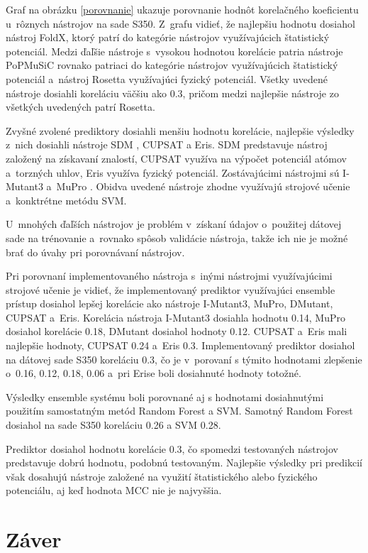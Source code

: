 Graf na obrázku \ref{porovnanie} ukazuje porovnanie hodnôt korelačného koeficientu u~rôznych nástrojov na sade S350. Z~grafu vidieť, že najlepšiu hodnotu dosiahol nástroj FoldX, ktorý patrí do kategórie nástrojov využívajúcich štatistický potenciál. Medzi ďaľšie nástroje s~vysokou hodnotou korelácie patria nástroje PoPMuSiC rovnako patriaci do kategórie nástrojov využívajúcich štatistický potenciál a~nástroj Rosetta využívajúci fyzický potenciál. Všetky uvedené nástroje dosiahli koreláciu väčšiu ako 0.3, pričom medzi najlepšie nástroje zo všetkých uvedených patrí Rosetta.

Zvyšné zvolené prediktory dosiahli menšiu hodnotu korelácie, najlepšie výsledky z~nich dosiahli nástroje SDM \cite{sdm}, CUPSAT a Eris. SDM predstavuje nástroj založený na získavaní znalostí, CUPSAT využíva na výpočet potenciál atómov a~torzných uhlov, Eris využíva fyzický potenciál. Zostávajúcimi nástrojmi sú I-Mutant3 a~MuPro \cite{mupro}. Obidva uvedené nástroje zhodne využívajú strojové učenie a~konktrétne metódu SVM.
 
U~mnohých ďaľších nástrojov je problém v~získaní údajov o~použitej dátovej sade na trénovanie a~rovnako spôsob validácie nástroja, takže ich nie je možné brať do úvahy pri porovnávaní nástrojov.

Pri porovnaní implementovaného nástroja s~inými nástrojmi využívajúcimi strojové učenie je vidieť, že implementovaný prediktor využívajúci ensemble prístup dosiahol lepšej korelácie ako nástroje I-Mutant3, MuPro, DMutant, CUPSAT a~Eris. Korelácia nástroja I-Mutant3 dosiahla hodnotu 0.14, MuPro dosiahol korelácie 0.18, DMutant dosiahol hodnoty 0.12. CUPSAT a~Eris mali najlepšie hodnoty, CUPSAT 0.24 a~Eris 0.3. Implementovaný prediktor dosiahol na dátovej sade S350 koreláciu 0.3, čo je v~porovaní s týmito hodnotami zlepšenie o~0.16, 0.12, 0.18, 0.06 a~pri Erise boli dosiahnuté hodnoty totožné.

Výsledky ensemble systému boli porovnané aj s hodnotami dosiahnutými použitím samostatným metód Random Forest a SVM. Samotný Random Forest dosiahol na sade S350 koreláciu 0.26 a SVM 0.28.

Prediktor dosiahol hodnotu korelácie 0.3, čo spomedzi testovaných nástrojov predstavuje dobrú hodnotu, podobnú testovaným. Najlepšie výsledky pri predikcií však dosahujú nástroje založené na využití štatistického alebo fyzického potenciálu, aj keď hodnota MCC nie je najvyššia.

\chapter{Záver}

